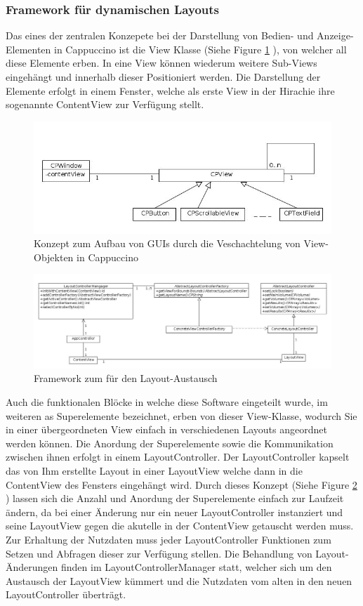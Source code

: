 \subsubsection{Framework für dynamischen Layouts}
\label{sec:Umsetzung der dynamischen Layouts}
Das eines der zentralen Konzepete bei der Darstellung von Bedien- und Anzeige-Elementen in Cappuccino ist die View Klasse (Siehe Figure \ref{fig:cappuccino_view_concept} ), 
von welcher all diese Elemente erben.
In eine View können wiederum weitere Sub-Views eingehängt und innerhalb dieser Positioniert werden.
Die Darstellung der Elemente erfolgt in einem Fenster, welche als erste View in der Hirachie ihre sogenannte ContentView zur Verfügung stellt.
\begin{figure}[t]
	\centering
	\includegraphics[width=0.6\linewidth]{img/c3_cappuccino_view_concept.jpg}
	\caption{Konzept zum Aufbau von GUIs durch die Veschachtelung von View-Objekten in Cappuccino}
	\label{fig:cappuccino_view_concept}
\end{figure}
\begin{figure}[t]
	\centering
	\includegraphics[width=\linewidth]{img/s3_layoutController_framework.jpg}
	\caption{Framework zum für den Layout-Austausch}
	\label{fig:layout_framework}
\end{figure}

Auch die funktionalen Blöcke in welche diese Software eingeteilt wurde, 
im weiteren as Superelemente bezeichnet, 
erben von dieser View-Klasse, 
wodurch Sie in einer übergeordneten View einfach in verschiedenen Layouts angeordnet werden können.
Die Anordung der Superelemente sowie die Kommunikation zwischen ihnen erfolgt in einem LayoutController.
Der LayoutController kapselt das von Ihm erstellte Layout in einer LayoutView welche dann in die ContentView des Fensters eingehängt wird.
Durch dieses Konzept (Siehe Figure \ref{fig:layout_framework} ) lassen sich die Anzahl und Anordung der Superelemente einfach zur Laufzeit ändern,
da bei einer Änderung nur ein neuer LayoutController instanziert und seine LayoutView gegen die akutelle in der ContentView getauscht werden muss.
Zur Erhaltung der Nutzdaten muss jeder LayoutController Funktionen zum Setzen und Abfragen dieser zur Verfügung stellen.
Die Behandlung von Layout-Änderungen finden im LayoutControllerManager statt, 
welcher sich um den Austausch der LayoutView kümmert und die Nutzdaten vom alten in den neuen LayoutController überträgt.

